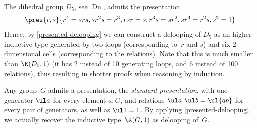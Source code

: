 \begin{example}
  The dihedral group $D_5$, see \cref{Dn}, admits the presentation
  \[
    \pres{r,s}{r^4=srs,sr^2s=r^3,rsr=s,r^3s=sr^2,sr^3=r^2s,s^2=1}
  \]
  Hence, by \cref{presented-delooping} we can construct a delooping of $D_5$ as an
  higher inductive type generated by two loops (corresponding to~$r$ and $s$)
  and six $2$-dimensional cells (corresponding to the relations). Note that this
  is much smaller than $\K(D_5,1)$ (it has 2 instead of 10 generating loops, and
  6 instead of 100 relations), thus resulting in shorter proofs when reasoning
  by induction.
\end{example}

\begin{example}
  Any group~$G$ admits a presentation, the \emph{standard presentation}, with one generator $\ul a$ for every element $a:G$, and relations $\ul a\,\,\ul b=\ul{ab}$ for every pair of generators, as well as $\ul 1=1$. By applying \cref{presented-delooping}, we actually recover the inductive type~$\K(G,1)$ as delooping of~$G$.
\end{example}

